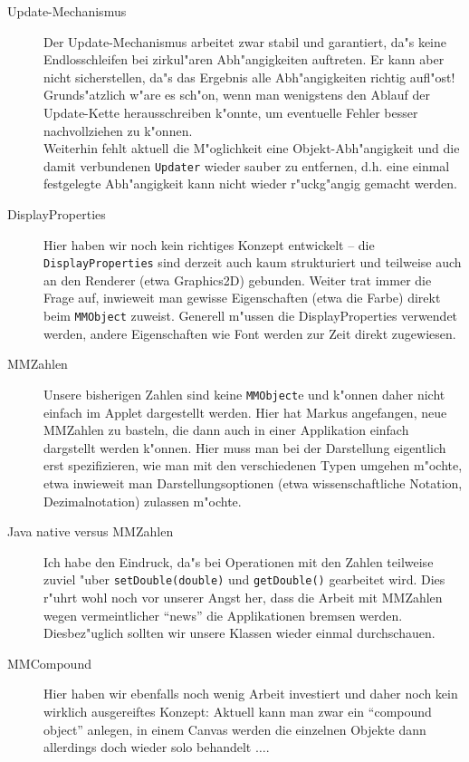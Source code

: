 \documentclass[a4paper,12pt]{article}
\newcommand{\code}[1]{\texttt{#1}}
\begin{document}
\begin{description}
\item [Update-Mechanismus]
Der Update-Mechanismus arbeitet zwar stabil und garantiert, da"s keine
Endlosschleifen bei zirkul"aren Abh"angigkeiten auftreten. Er kann aber nicht
sicherstellen, da"s das Ergebnis alle Abh"angigkeiten richtig aufl"ost!
Grunds"atzlich w"are es sch"on, wenn man wenigstens den Ablauf der Update-Kette
herausschreiben k"onnte, um eventuelle Fehler besser nachvollziehen zu
k"onnen.\\
Weiterhin fehlt aktuell die M"oglichkeit eine Objekt-Abh"angigkeit und die
damit verbundenen \code{Updater} wieder sauber zu entfernen, d.h. eine einmal
festgelegte Abh"angigkeit kann nicht wieder r"uckg"angig gemacht werden.

\item [DisplayProperties]
Hier haben wir noch kein richtiges Konzept entwickelt --
die \code{DisplayProperties} sind derzeit auch kaum strukturiert und
teilweise auch an den Renderer (etwa Graphics2D) gebunden. Weiter trat immer
die Frage auf, inwieweit man gewisse Eigenschaften (etwa die Farbe) direkt beim
\code{MMObject} zuweist. Generell m"ussen die DisplayProperties
verwendet werden, andere Eigenschaften wie Font werden zur Zeit direkt
zugewiesen.

\item [MMZahlen]
Unsere bisherigen Zahlen sind keine \code{MMObject}e und k"onnen daher nicht
einfach im Applet dargestellt werden. Hier hat Markus angefangen, neue
MMZahlen zu basteln, die dann auch in einer Applikation einfach dargstellt
werden k"onnen.
Hier muss man bei der Darstellung eigentlich erst spezifizieren,
wie man mit den
verschiedenen Typen umgehen m"ochte, etwa inwieweit man Darstellungsoptionen
(etwa wissenschaftliche Notation, Dezimalnotation) zulassen m"ochte.

\item [Java native versus MMZahlen]
Ich habe den Eindruck, da"s bei Operationen mit den Zahlen teilweise zuviel
"uber \code{setDouble(double)} und \code{getDouble()} gearbeitet wird. Dies
r"uhrt wohl noch vor unserer Angst her, dass die Arbeit mit MMZahlen wegen
vermeintlicher ``news'' die Applikationen bremsen werden.
Diesbez"uglich sollten wir unsere Klassen wieder einmal durchschauen.

\item [MMCompound]
Hier haben wir ebenfalls noch wenig Arbeit investiert und daher noch kein
wirklich ausgereiftes Konzept: Aktuell kann man zwar ein ``compound object''
anlegen, in einem Canvas werden die einzelnen Objekte dann allerdings doch
wieder solo behandelt $\ldots$.


\end{description}
\end{document}
